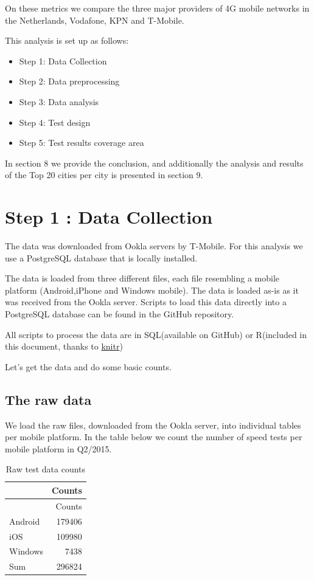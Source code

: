 \documentclass[]{article}
\begin{document}
On these metrics we compare the three major providers of 4G mobile
networks in the Netherlands, Vodafone, KPN and T-Mobile.

This analysis is set up as follows:

\begin{itemize}
\itemsep1pt\parskip0pt
\item
  Step 1: Data Collection
\item
  Step 2: Data preprocessing\\
\item
  Step 3: Data analysis
\item
  Step 4: Test design
\item
  Step 5: Test results coverage area
\end{itemize}

In section 8 we provide the conclusion, and additionally the analysis
and results of the Top 20 cities per city is presented in section 9.

\section{Step 1 : Data Collection}\label{step-1-data-collection}

The data was downloaded from Ookla servers by T-Mobile. For this
analysis we use a PostgreSQL database that is locally installed.

The data is loaded from three different files, each file resembling a
mobile platform (Android,iPhone and Windows mobile). The data is loaded
as-is as it was received from the Ookla server. Scripts to load this
data directly into a PostgreSQL database can be found in the GitHub
repository.

All scripts to process the data are in SQL(available on GitHub) or
R(included in this document, thanks to
\href{http://yihui.name/knitr/}{knitr})

Let's get the data and do some basic counts.

\subsection{The raw data}\label{the-raw-data}

We load the raw files, downloaded from the Ookla server, into individual
tables per mobile platform. In the table below we count the number of
speed tests per mobile platform in Q2/2015.

\begin{longtable}[c]{@{}lr@{}}
\caption{Raw test data counts}\tabularnewline
\toprule
& Counts\tabularnewline
\midrule
\endfirsthead
\toprule
& Counts\tabularnewline
\midrule
\endhead
Android & 179406\tabularnewline
iOS & 109980\tabularnewline
Windows & 7438\tabularnewline
Sum & 296824\tabularnewline
\bottomrule
\end{longtable}
\end{document}
